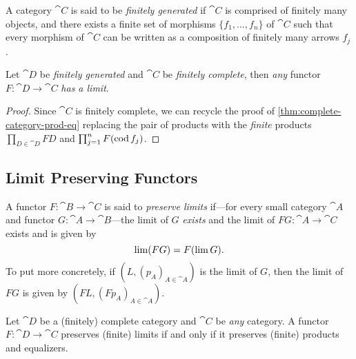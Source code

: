 \begin{definition}
    \label{def:finitely-generated-category}
    A category \(\cat C\) is said to be \emph{finitely generated} if \(\cat C\) is
    comprised of finitely many objects, and there exists a finite set of
    morphisms \(\{f_1, \dots, f_n\}\) of \(\cat C\) such that every morphism of
    \(\cat C\) can be written as a composition of finitely many arrows \(f_j\).
\end{definition}

\begin{proposition}
    \label{prop:fin-gen-to-fin-complete-has-limits}
    Let \(\cat D\) be \emph{finitely generated} and \(\cat C\) be \emph{finitely
        complete}, then \emph{any} functor \(F: \cat D \to \cat C\) \emph{has a
        limit}.
\end{proposition}

\begin{proof}
    Since \(\cat C\) is finitely complete, we can recycle the proof of
    \cref{thm:complete-category-prod-eq} replacing the pair of products with the
    \emph{finite} products \(\prod_{D \in \cat D} F D\) and
    \(\prod_{j=1}^n F(\operatorname{cod} f_j)\).
\end{proof}

\subsection{Limit Preserving Functors}

\begin{definition}
    \label{def:limit-preserving-functor}
    A functor \(F: \cat B \to \cat C\) is said to \emph{preserve limits} if---for
    every small category \(\cat A\) and functor \(G: \cat A \to \cat B\)---the
    limit of \(G\) \emph{exists} and the limit of \(F G: \cat A \to \cat C\) exists
    and is given by
    \[
        \operatorname{lim}(F G) = F(\operatorname{lim} G).
    \]
    To put more concretely, if \((L, (p_A)_{A \in \cat A})\) is the limit of \(G\),
    then the limit of \(F G\) is given by \((F L, (F p_A)_{A \in \cat A})\).
\end{definition}

\begin{proposition}
    \label{prop:fin-complete-cat-func-preserves-iff-prod-eq}
    Let \(\cat D\) be a (finitely) complete category and \(\cat C\) be \emph{any}
    category. A functor \(F: \cat D \to \cat C\) preserves (finite) limits if and
    only if it preserves (finite) products and equalizers.
\end{proposition}

